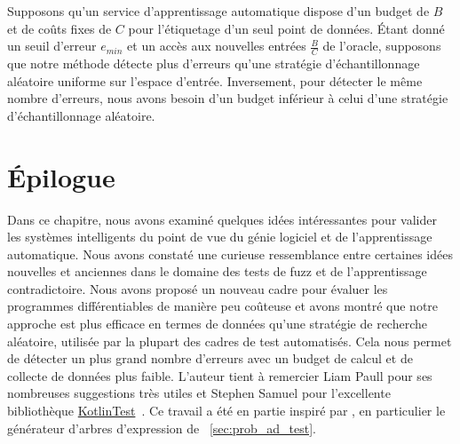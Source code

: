 Supposons qu'un service d'apprentissage automatique dispose d'un budget de $B$ et de coûts fixes de $C$ pour l'étiquetage d'un seul point de données. Étant donné un seuil d'erreur $e_{min}$ et un accès aux nouvelles entrées $\frac{B}{C}$ de l'oracle, supposons que notre méthode détecte plus d'erreurs qu'une stratégie d'échantillonnage aléatoire uniforme sur l'espace d'entrée. Inversement, pour détecter le même nombre d'erreurs, nous avons besoin d'un budget inférieur à celui d'une stratégie d'échantillonnage aléatoire.

\section{Épilogue}

Dans ce chapitre, nous avons examiné quelques idées intéressantes pour valider les systèmes intelligents du point de vue du génie logiciel et de l'apprentissage automatique. Nous avons constaté une curieuse ressemblance entre certaines idées nouvelles et anciennes dans le domaine des tests de fuzz et de l'apprentissage contradictoire. Nous avons proposé un nouveau cadre pour évaluer les programmes différentiables de manière peu coûteuse et avons montré que notre approche est plus efficace en termes de données qu'une stratégie de recherche aléatoire, utilisée par la plupart des cadres de test automatisés. Cela nous permet de détecter un plus grand nombre d'erreurs avec un budget de calcul et de collecte de données plus faible. L'auteur tient à remercier Liam Paull pour ses nombreuses suggestions très utiles et Stephen Samuel pour l'excellente bibliothèque \href{https://github.com/kotlintest/kotlintest}{KotlinTest}~\citep{kotlintest}. Ce travail a été en partie inspiré par \citet{lample2019deep}, en particulier le générateur d'arbres d'expression de ~\autoref{sec:prob_ad_test}.
